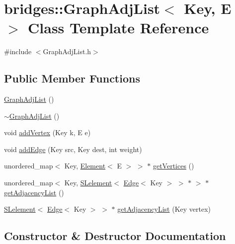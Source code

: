\hypertarget{classbridges_1_1_graph_adj_list}{}\section{bridges\+:\+:Graph\+Adj\+List$<$ Key, E $>$ Class Template Reference}
\label{classbridges_1_1_graph_adj_list}


{\ttfamily \#include $<$Graph\+Adj\+List.\+h$>$}

\subsection*{Public Member Functions}
\begin{DoxyCompactItemize}
\item 
\hyperlink{classbridges_1_1_graph_adj_list_a0a185744acc43305f73a8db0e3bbb7e2}{Graph\+Adj\+List} ()
\item 
\hyperlink{classbridges_1_1_graph_adj_list_ac9b898cd9df35ba09b2eeb6f085e3818}{$\sim$\+Graph\+Adj\+List} ()
\item 
void \hyperlink{classbridges_1_1_graph_adj_list_a813758981e1c64b91450f4026c8e8700}{add\+Vertex} (Key k, E e)
\item 
void \hyperlink{classbridges_1_1_graph_adj_list_a3085d848a5e6ea9c5292e804e2ae80b8}{add\+Edge} (Key src, Key dest, int weight)
\item 
unordered\+\_\+map$<$ Key, \hyperlink{classbridges_1_1_element}{Element}$<$ E $>$ $>$ $\ast$ \hyperlink{classbridges_1_1_graph_adj_list_a07ac6ad2cb0aebab37103de72e2e6719}{get\+Vertices} ()
\item 
unordered\+\_\+map$<$ Key, \hyperlink{classbridges_1_1_s_lelement}{S\+Lelement}$<$ \hyperlink{classbridges_1_1_edge}{Edge}$<$ Key $>$ $>$ $\ast$ $>$ $\ast$ \hyperlink{classbridges_1_1_graph_adj_list_a72f55641dabb692491639451c026496f}{get\+Adjacency\+List} ()
\item 
\hyperlink{classbridges_1_1_s_lelement}{S\+Lelement}$<$ \hyperlink{classbridges_1_1_edge}{Edge}$<$ Key $>$ $>$ $\ast$ \hyperlink{classbridges_1_1_graph_adj_list_a4246f696bdec73aa2c4bdbcce5f66adf}{get\+Adjacency\+List} (Key vertex)
\end{DoxyCompactItemize}


\subsection{Constructor \& Destructor Documentation}
\hypertarget{classbridges_1_1_graph_adj_list_a0a185744acc43305f73a8db0e3bbb7e2}{}
